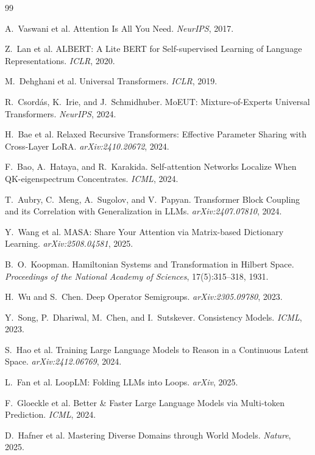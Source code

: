 \documentclass[11pt, a4paper]{article}
\theoremstyle{plain}
\theoremstyle{remark}
\begin{document}
\begin{thebibliography}{99}

A.~Vaswani et al.
Attention Is All You Need.
\emph{NeurIPS}, 2017.

Z.~Lan et al.
ALBERT: A Lite BERT for Self-supervised Learning of Language Representations.
\emph{ICLR}, 2020.

M.~Dehghani et al.
Universal Transformers.
\emph{ICLR}, 2019.

R.~Csord\'{a}s, K.~Irie, and J.~Schmidhuber.
MoEUT: Mixture-of-Experts Universal Transformers.
\emph{NeurIPS}, 2024.

H.~Bae et al.
Relaxed Recursive Transformers: Effective Parameter Sharing with Cross-Layer LoRA.
\emph{arXiv:2410.20672}, 2024.

F.~Bao, A.~Hataya, and R.~Karakida.
Self-attention Networks Localize When QK-eigenspectrum Concentrates.
\emph{ICML}, 2024.

T.~Aubry, C.~Meng, A.~Sugolov, and V.~Papyan.
Transformer Block Coupling and its Correlation with Generalization in LLMs.
\emph{arXiv:2407.07810}, 2024.

Y.~Wang et al.
MASA: Share Your Attention via Matrix-based Dictionary Learning.
\emph{arXiv:2508.04581}, 2025.

B.~O.~Koopman.
Hamiltonian Systems and Transformation in Hilbert Space.
\emph{Proceedings of the National Academy of Sciences}, 17(5):315--318, 1931.

H.~Wu and S.~Chen.
Deep Operator Semigroups.
\emph{arXiv:2305.09780}, 2023.

Y.~Song, P.~Dhariwal, M.~Chen, and I.~Sutskever.
Consistency Models.
\emph{ICML}, 2023.

S.~Hao et al.
Training Large Language Models to Reason in a Continuous Latent Space.
\emph{arXiv:2412.06769}, 2024.

L.~Fan et al.
LoopLM: Folding LLMs into Loops.
\emph{arXiv}, 2025.

F.~Gloeckle et al.
Better \& Faster Large Language Models via Multi-token Prediction.
\emph{ICML}, 2024.

D.~Hafner et al.
Mastering Diverse Domains through World Models.
\emph{Nature}, 2025.

\end{thebibliography}
\end{document}
